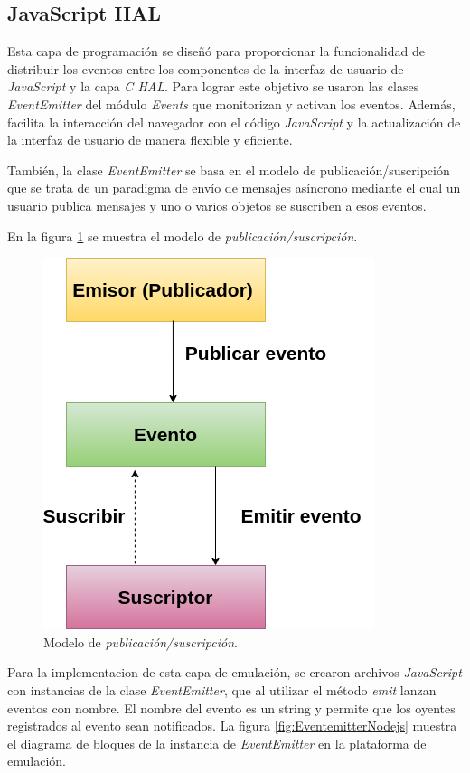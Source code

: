 \subsection{JavaScript HAL}

Esta capa de programación se diseñó para proporcionar la funcionalidad de distribuir los eventos entre los componentes de la interfaz de usuario de \textit{JavaScript} y la capa \textit{C HAL}. Para lograr este objetivo se usaron las clases \textit{EventEmitter} del módulo \textit{Events} que monitorizan y activan los eventos. Además, facilita la interacción del navegador con el código \textit{JavaScript} y la actualización de la interfaz de usuario de manera flexible y eficiente.

También, la clase \textit{EventEmitter} se basa en el modelo de publicación/suscripción que se trata de un paradigma de envío de mensajes asíncrono mediante el cual un usuario publica mensajes y uno o varios objetos se suscriben a esos eventos.

En la figura \ref{fig:PublicarSuscribir} se muestra el modelo de \textit{publicación/suscripción}.

\begin{figure}[ht]
	\centering
	\includegraphics[scale=.49]{./Figures/PublicarSuscribir.png}
	\caption{Modelo de \textit{publicación/suscripción}.}
	\label{fig:PublicarSuscribir}
\end{figure}

Para la implementacion de esta capa de emulación, se crearon archivos \textit{JavaScript} con instancias de la clase \textit{EventEmitter}, que al utilizar el método \textit{emit} lanzan eventos con nombre. El nombre del evento es un string y permite que los oyentes registrados al evento sean notificados. La figura \ref{fig:EventemitterNodejs} muestra el diagrama de bloques de la instancia de \textit{EventEmitter} en la plataforma de emulación.

